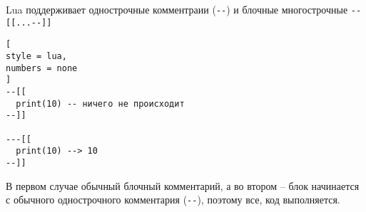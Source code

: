 \documentclass[%
	11pt,
	a4paper,
	utf8,
		]{article}
\begin{document}
Lua поддерживает однострочные комментраии (\verb|--|) и блочные многострочные \verb|--[[...--]]|
\begin{lstlisting}[
style = lua,
numbers = none	
]
--[[
  print(10) -- ничего не происходит
--]]

---[[
  print(10) --> 10
--]]
\end{lstlisting}

В первом случае обычный блочный комментарий, а во втором -- блок начинается с обычного однострочного комментария (\verb|--|), поэтому все, код выполняется.




\begin{thebibliography}{99}
\end{thebibliography}
\end{document}
